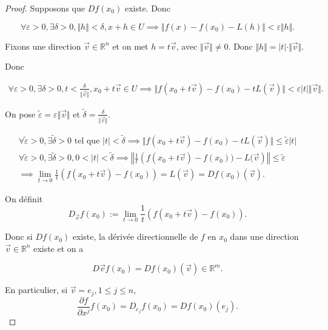 \documentclass[french]{article}
\theoremstyle{definition}
\newcommand{\lesss}{<}
\newcommand{\less}{\lesss}
\newcommand{\biggg}{>}
\newcommand{\bg}{\biggg}
\begin{document}
\begin{proof}
  Supposons que $Df(x_0)$ existe. Donc

  $$ \forall \varepsilon \bg 0, \exists \delta \bg 0, \Vert h \Vert \less \delta , x+h \in U  \implies \Vert f(x) -f(x_0) - L(h) \Vert \less \varepsilon \Vert h \Vert . $$

  Fixons une direction $\vec{ v } \in \mathbb{R}^n$ et on met $h = t \vec{ v } $, avec $\Vert \vec{ v }  \Vert \neq 0$. Donc $\Vert h \Vert = \lvert t \rvert \cdot \Vert \vec{ v }  \Vert  $.

  Donc

  \begin{gather*}
    \forall \varepsilon \bg 0, \exists \delta  \bg 0, t \less \frac{\delta }{\Vert \vec{ v }  \Vert}, x_0 + t \vec{ v }  \in U \implies \Vert f(x_0+t \vec{ v } )-f(x_0)-tL(\vec{ v } ) \Vert \less \varepsilon \lvert t \rvert \Vert \vec{ v }  \Vert .
  \end{gather*}

  On pose $\tilde{\varepsilon } = \varepsilon  \Vert \vec{ v }  \Vert \text{ et }  \tilde{\delta } = \frac{\delta }{\Vert \vec{ v }  \Vert } $.

  \begin{gather*}
    \forall \tilde{\varepsilon } \bg 0, \exists \tilde{ \delta } \bg 0 \text{ tel que } \lvert t \rvert \less \tilde{\delta } \implies \Vert f(x_0+t \vec{ v } ) -f(x_0)-tL(\vec{ v } ) \Vert   \leq \tilde{\varepsilon }\lvert t \rvert \\
    \forall \tilde{\varepsilon } \bg 0, \exists \tilde{ \delta } \bg 0,  0 < \lvert t \rvert \less \tilde{\delta } \implies \left\Vert \frac{1}{t}\left(f(x_0 + t \vec{ v } ) -f(x_0)) - L(\vec{ v } \right) \right\Vert \leq \tilde{\varepsilon } \\
    \implies \lim_{t \to 0} \frac{1}{t}\left(f(x_0+t \vec{ v } )-f(x_0)\right) = L(\vec{ v } ) = Df(x_0)(\vec{ v } ) .
  \end{gather*}

  On définit
  \begin{equation*}
    D _{\vec{ v } }f(x_0) := \lim_{t \to 0} \frac{1}{t}(f(x_0+t \vec{ v } )-f(x_0)).
  \end{equation*}

  Donc si $Df(x_0)$ existe, la dérivée directionnelle de $f$ en $x_0$ dans une direction $\vec{ v } \in \mathbb{R}^n$ existe et on a

  $$ D \vec{ v } f(x_0) = Df(x_0)(\vec{ v } ) \in \mathbb{R}^m.$$

  En particulier, si $\vec{ v } = e_j, 1 \leq j \leq n $,
  \begin{equation*}
    \frac{\partial f }{\partial x^j }f(x_0) = D _{e _{j}} f(x_0) = Df(x_0)(e_j).
  \end{equation*}
\end{proof}
\end{document}
